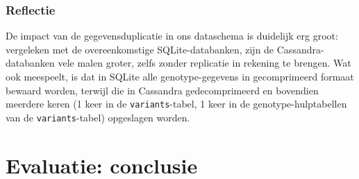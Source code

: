 \subsubsection{Reflectie}

De impact van de gegevensduplicatie in ons dataschema is duidelijk erg groot: vergeleken met de overeenkomstige SQLite-databanken, zijn de Cassandra-databanken vele malen groter, zelfs zonder replicatie in rekening te brengen. Wat ook meespeelt, is dat in SQLite alle genotype-gegevens in gecomprimeerd formaat bewaard worden, terwijl die in Cassandra gedecomprimeerd en bovendien meerdere keren (1 keer in de \texttt{variants}-tabel, 1 keer in de genotype-hulptabellen van de \texttt{variants}-tabel) opgeslagen worden.

\section{Evaluatie: conclusie}

